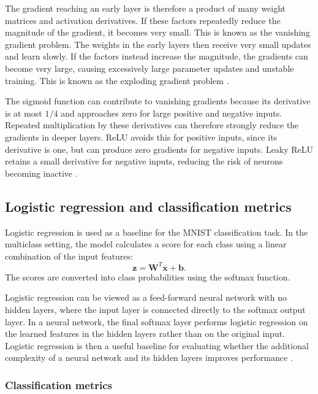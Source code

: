 \documentclass[amssymb,secnumarabic,twocolumn,aps]{revtex4}
\begin{document}
The gradient reaching an early layer is therefore a product of many weight matrices and activation derivatives. If these factors repeatedly reduce the magnitude of the gradient, it becomes very small. This is known as the vanishing gradient problem. The weights in the early layers then receive very small updates and learn slowly. If the factors instead increase the magnitude, the gradients can become very large, causing excessively large parameter updates and unstable training. This is known as the exploding gradient problem \cite{lecturebook}.

The sigmoid function can contribute to vanishing gradients because its derivative is at most $1/4$ and approaches zero for large positive and negative inputs. Repeated multiplication by these derivatives can therefore strongly reduce the gradients in deeper layers. ReLU avoids this for positive inputs, since its derivative is one, but can produce zero gradients for negative inputs. Leaky ReLU retains a small derivative for negative inputs, reducing the risk of neurons becoming inactive \cite{lecturebook}.

\subsection{Logistic regression and classification metrics}

Logistic regression is used as a baseline for the MNIST classification task. In the multiclass setting, the model calculates a score for each class using a linear combination of the input features:
\begin{equation*}
    \boldsymbol{z}
    =\boldsymbol{W}^T\boldsymbol{x}+\boldsymbol{b}.
\end{equation*}
The scores are converted into class probabilities using the softmax function.

Logistic regression can be viewed as a feed-forward neural network with no hidden layers, where the input layer is connected directly to the softmax output layer. In a neural network, the final softmax layer performs logistic regression on the learned features in the hidden layers rather than on the original input. Logistic regression is then a useful baseline for evaluating whether the additional complexity of a neural network and its hidden layers improves performance \cite{lecturebook}.

\subsubsection{Classification metrics}
\end{document}
